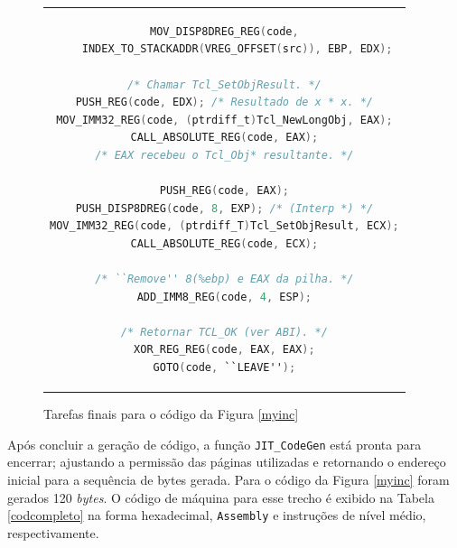 \begin{figure}[ht!]
  \centering
  \begin{tabular}{c}
    \begin{lstlisting}[language=C]
MOV_DISP8DREG_REG(code,
    INDEX_TO_STACKADDR(VREG_OFFSET(src)), EBP, EDX);

/* Chamar Tcl_SetObjResult. */
PUSH_REG(code, EDX); /* Resultado de x * x. */
MOV_IMM32_REG(code, (ptrdiff_t)Tcl_NewLongObj, EAX);
CALL_ABSOLUTE_REG(code, EAX);
/* EAX recebeu o Tcl_Obj* resultante. */

PUSH_REG(code, EAX);
PUSH_DISP8DREG(code, 8, EXP); /* (Interp *) */
MOV_IMM32_REG(code, (ptrdiff_T)Tcl_SetObjResult, ECX);
CALL_ABSOLUTE_REG(code, ECX);

/* ``Remove'' 8(%ebp) e EAX da pilha. */
ADD_IMM8_REG(code, 4, ESP);

/* Retornar TCL_OK (ver ABI). */
XOR_REG_REG(code, EAX, EAX);
GOTO(code, ``LEAVE'');
    \end{lstlisting}
  \end{tabular}
  \caption{Tarefas finais para o código da Figura \ref{myinc}\label{myinc-last}}
\end{figure}

Após concluir a geração de código, a função
\verb!JIT_CodeGen! está pronta para encerrar; ajustando a permissão
das páginas utilizadas e retornando
o endereço inicial para a sequência de bytes gerada. %
Para o código da Figura \ref{myinc} foram gerados 120 \textit{bytes}.
O código de máquina para esse trecho é exibido na Tabela
\ref{codcompleto} na forma hexadecimal, \texttt{Assembly} e instruções
de nível médio, respectivamente.

